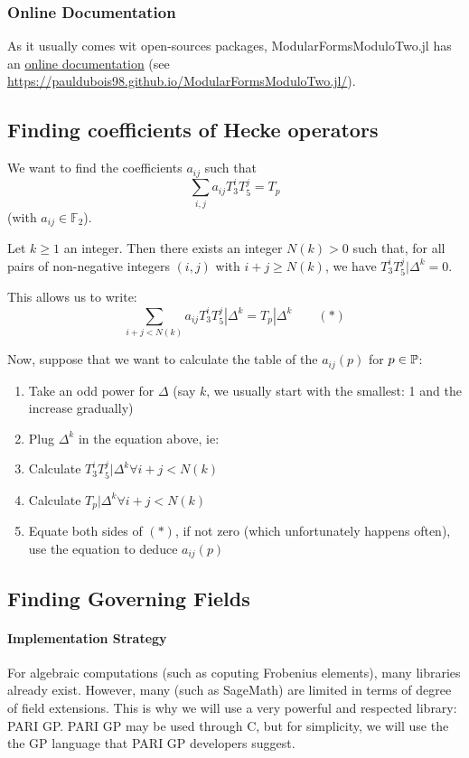 \subsubsection{Online Documentation}
As it usually comes wit open-sources packages, ModularFormsModuloTwo.jl has an \href{https://pauldubois98.github.io/ModularFormsModuloTwo.jl/}{online documentation} (see \url{https://pauldubois98.github.io/ModularFormsModuloTwo.jl/}).




\subsection{Finding coefficients of Hecke operators}
We want to find the coefficients $a_{ij}$ such that $$\sum_{i, j} a_{ij} T_3^iT_5^j = T_p$$
(with $a_{ij} \in \mathbb{F}_2$).

Let $k\geq 1$ an integer.
Then there exists an integer $N(k)>0$ such that,
for all pairs of non-negative integers $(i, j)$ with $i+j \geq N(k)$,
we have $T_3^{i}T_5^{j}|\Delta^k = 0$.

This allows us to write:
$$\sum_{i+j < N(k)} a_{ij} T_3^iT_5^j|\Delta^k= T_p|\Delta^k \qquad (*)$$

Now, suppose that we want to calculate the table of the $a_{ij}(p)$ for $p \in \mathbb{P}$:
\begin{enumerate}
    \item Take an odd power for $\Delta$ (say $k$, we usually start with the smallest: 1 and the increase gradually)
    \item Plug $\Delta^k$ in the equation above, ie:
    \item Calculate $T_3^iT_5^j|\Delta^k \forall i+j < N(k)$
    \item Calculate $T_p|\Delta^k \forall i+j < N(k)$
    \item Equate both sides of $(*)$, if not zero (which unfortunately happens often), use the equation to deduce $a_{ij}(p)$
\end{enumerate}

\subsection{Finding Governing Fields}
\paragraph{Implementation Strategy}
For algebraic computations (such as coputing Frobenius elements), many libraries already exist.
However, many (such as SageMath) are limited in terms of degree of field extensions.
This is why we will use a very powerful and respected library: PARI GP.
PARI GP may be used through C, but for simplicity, we will use the the GP language that PARI GP developers suggest.

